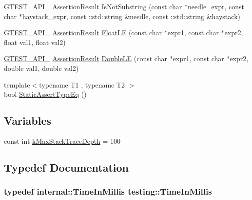 \begin{DoxyCompactItemize}
\item 
\hyperlink{gtest-port_8h_aa73be6f0ba4a7456180a94904ce17790}{G\+T\+E\+S\+T\+\_\+\+A\+P\+I\+\_\+} \hyperlink{classtesting_1_1_assertion_result}{Assertion\+Result} \hyperlink{namespacetesting_a645d822e47dc64b9923e78c880807f12}{Is\+Not\+Substring} (const char $\ast$needle\+\_\+expr, const char $\ast$haystack\+\_\+expr, const \+::std\+::string \&needle, const \+::std\+::string \&haystack)
\item 
\hyperlink{gtest-port_8h_aa73be6f0ba4a7456180a94904ce17790}{G\+T\+E\+S\+T\+\_\+\+A\+P\+I\+\_\+} \hyperlink{classtesting_1_1_assertion_result}{Assertion\+Result} \hyperlink{namespacetesting_a69106491c2e7f50e50da0ce5e8ae4374}{Float\+L\+E} (const char $\ast$expr1, const char $\ast$expr2, float val1, float val2)
\item 
\hyperlink{gtest-port_8h_aa73be6f0ba4a7456180a94904ce17790}{G\+T\+E\+S\+T\+\_\+\+A\+P\+I\+\_\+} \hyperlink{classtesting_1_1_assertion_result}{Assertion\+Result} \hyperlink{namespacetesting_a84c020b981d0eb4eabfb0feda155aaaf}{Double\+L\+E} (const char $\ast$expr1, const char $\ast$expr2, double val1, double val2)
\item 
{\footnotesize template$<$typename T1 , typename T2 $>$ }\\bool \hyperlink{namespacetesting_a661e70fc6afeb5c085eed3716aa45059}{Static\+Assert\+Type\+Eq} ()
\end{DoxyCompactItemize}
\subsection*{Variables}
\begin{DoxyCompactItemize}
\item 
const int \hyperlink{namespacetesting_ae605f2ccac04616bb7812ca72e517082}{k\+Max\+Stack\+Trace\+Depth} = 100
\end{DoxyCompactItemize}


\subsection{Typedef Documentation}
\hypertarget{namespacetesting_a992de1d091ce660f451d1e8b3ce30fd6}{
\subsubsection[{Time\+In\+Millis}]{\setlength{\rightskip}{0pt plus 5cm}typedef {\bf internal\+::\+Time\+In\+Millis} {\bf testing\+::\+Time\+In\+Millis}}}\label{namespacetesting_a992de1d091ce660f451d1e8b3ce30fd6}



